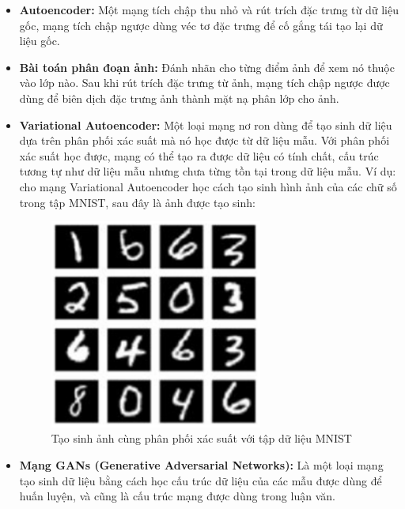 \begin{itemize}
    \item \textbf{Autoencoder:} Một mạng tích chập thu nhỏ và rút trích đặc trưng từ dữ liệu gốc, mạng tích chập ngược dùng véc tơ đặc trưng để cố gắng tái tạo lại dữ liệu gốc.
    \item \textbf{Bài toán phân đoạn ảnh:} Đánh nhãn cho từng điểm ảnh để xem nó thuộc vào lớp nào. Sau khi rút trích đặc trưng từ ảnh, mạng tích chập ngược được dùng để biên dịch đặc trưng ảnh thành mặt nạ phân lớp cho ảnh.
    \item \textbf{Variational Autoencoder:} Một loại mạng nơ ron dùng để tạo sinh dữ liệu dựa trên phân phối xác suất mà nó học được từ dữ liệu mẫu. Với phân phối xác suất học được, mạng có thể tạo ra được dữ liệu có tính chất, cấu trúc tương tự như dữ liệu mẫu nhưng chưa từng tồn tại trong dữ liệu mẫu. Ví dụ: cho mạng Variational Autoencoder học cách tạo sinh hình ảnh của các chữ số trong tập MNIST, sau đây là ảnh được tạo sinh: 
        \begin{figure}[H]
            \centering
            \includegraphics[width=7cm]{./content/materials/mnist_vae.png}
            \caption{Tạo sinh ảnh cùng phân phối xác suất với tập dữ liệu MNIST}
        \end{figure}
    \item \textbf{Mạng GANs (Generative Adversarial Networks):} Là một loại mạng tạo sinh dữ liệu bằng cách học cấu trúc dữ liệu của các mẫu được dùng để huấn luyện, và cũng là cấu trúc mạng được dùng trong luận văn.
\end{itemize}

